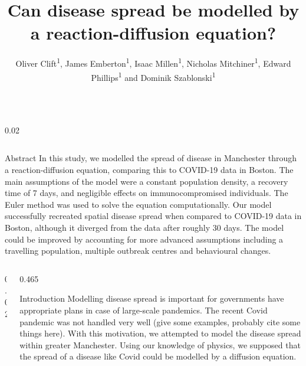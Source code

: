 \documentclass{beamer} %
\title{\Huge Can disease spread be modelled by a reaction-diffusion equation?} %
\author{Oliver Clift\textsuperscript{1}, James Emberton\textsuperscript{1}, Isaac Millen\textsuperscript{1}, Nicholas Mitchiner\textsuperscript{1}, Edward Phillips\textsuperscript{1} and Dominik Szablonski\textsuperscript{1}} %
\institute{\textsuperscript{1}Department of Physics, University of Manchester} %
\begin{document}
	
\begin{frame}[t] %

\begin{columns}[t] %

\begin{column}{0.02\textwidth}\end{column} %

\end{columns}

\hspace{0.015\textwidth}%
\begin{minipage}{0.97\textwidth}
\begin{block}{Abstract}
	In this study, we modelled the spread of disease in Manchester through a reaction-diffusion equation, comparing this to COVID-19 data in Boston. The main assumptions of the model were a constant population density, a recovery time of 7 days, and negligible effects on immunocompromised individuals. The Euler method was used to solve the equation computationally. Our model successfully recreated spatial disease spread when compared to COVID-19 data in Boston, although it diverged from the data after roughly 30 days. The model could be improved by accounting for more advanced assumptions including a travelling population, multiple outbreak centres and behavioural changes.

\end{block}
\end{minipage}

\begin{columns}[t]
\begin{column}{0.02\textwidth}\end{column}

\begin{column}{0.465\textwidth} %


            
\begin{block}{Introduction}
	Modelling disease spread is important for governments have appropriate plans in case of large-scale pandemics. The recent Covid pandemic was not handled very well (give some examples, probably cite some things here). With this motivation, we attempted to model the disease spread within greater Manchester. Using our knowledge of physics, we supposed that the spread of a disease like Covid could be modelled by a diffusion equation.
	

\end{block}
\end{column}
\end{columns}
\end{frame}
\end{document}
